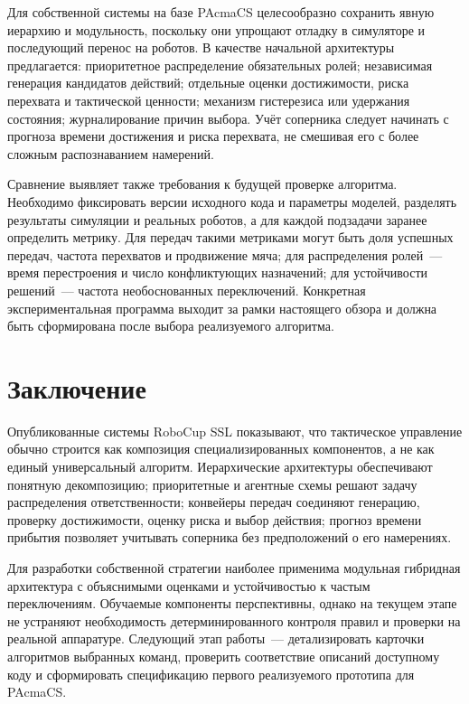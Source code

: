 \documentclass{misisarticle}
\begin{document}
Для собственной системы на базе PAcmaCS целесообразно сохранить явную иерархию и модульность, поскольку они упрощают отладку в симуляторе и последующий перенос на роботов. В качестве начальной архитектуры предлагается: приоритетное распределение обязательных ролей; независимая генерация кандидатов действий; отдельные оценки достижимости, риска перехвата и тактической ценности; механизм гистерезиса или удержания состояния; журналирование причин выбора. Учёт соперника следует начинать с прогноза времени достижения и риска перехвата, не смешивая его с более сложным распознаванием намерений.

Сравнение выявляет также требования к будущей проверке алгоритма. Необходимо фиксировать версии исходного кода и параметры моделей, разделять результаты симуляции и реальных роботов, а для каждой подзадачи заранее определить метрику. Для передач такими метриками могут быть доля успешных передач, частота перехватов и продвижение мяча; для распределения ролей~--- время перестроения и число конфликтующих назначений; для устойчивости решений~--- частота необоснованных переключений. Конкретная экспериментальная программа выходит за рамки настоящего обзора и должна быть сформирована после выбора реализуемого алгоритма.

\section{Заключение}

Опубликованные системы RoboCup SSL показывают, что тактическое управление обычно строится как композиция специализированных компонентов, а не как единый универсальный алгоритм. Иерархические архитектуры обеспечивают понятную декомпозицию; приоритетные и агентные схемы решают задачу распределения ответственности; конвейеры передач соединяют генерацию, проверку достижимости, оценку риска и выбор действия; прогноз времени прибытия позволяет учитывать соперника без предположений о его намерениях.

Для разработки собственной стратегии наиболее применима модульная гибридная архитектура с объяснимыми оценками и устойчивостью к частым переключениям. Обучаемые компоненты перспективны, однако на текущем этапе не устраняют необходимость детерминированного контроля правил и проверки на реальной аппаратуре. Следующий этап работы~--- детализировать карточки алгоритмов выбранных команд, проверить соответствие описаний доступному коду и сформировать спецификацию первого реализуемого прототипа для PAcmaCS.
\end{document}
